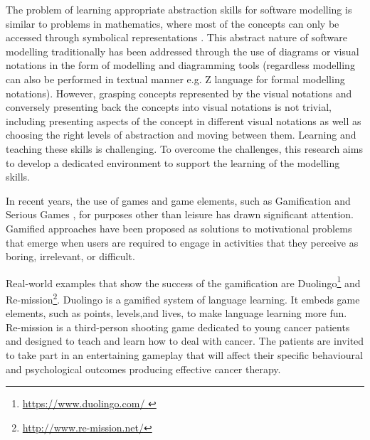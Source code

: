 \documentclass[12pt, a4paper]{report} \usepackage[titletoc]{appendix}
\begin{document}
The problem of learning appropriate abstraction skills for software modelling is similar to problems in mathematics, where most of the concepts can only be accessed through symbolical representations \cite{Duval2006}. This abstract nature of software modelling traditionally has been addressed through the use of diagrams or visual notations in the form of modelling and diagramming tools (regardless  modelling can also be performed in textual manner e.g. Z language for formal modelling notations). However, grasping concepts represented by the visual notations and conversely presenting back the concepts into visual notations is not trivial, including presenting aspects of the concept in different visual notations as well as choosing the right levels of abstraction and moving between them. Learning and teaching these skills is challenging. To overcome the challenges, this research aims to develop a dedicated environment to support the learning of the modelling skills. 
 
In recent years, the use of games and game elements, such as Gamification \cite{deterding2011game} and Serious Games \cite{Michael2005}, for purposes other than leisure has drawn significant attention. Gamified approaches have been proposed as solutions to motivational problems that emerge when users are required to engage in activities that they perceive as boring, irrelevant, or difficult. 

Real-world examples that show the success of the gamification are Duolingo\footnote{\url{https://www.duolingo.com/ }} and Re-mission\footnote{\url{http://www.re-mission.net/}}. Duolingo is a gamified system of language learning. It embeds game elements, such as points, levels,and lives, to make language learning more fun. Re-mission is a third-person shooting game dedicated to young cancer patients and designed to teach and learn how to deal with cancer. The patients are invited to take part in an entertaining gameplay that will affect their specific behavioural and psychological outcomes producing effective cancer therapy.
 
\end{document}
